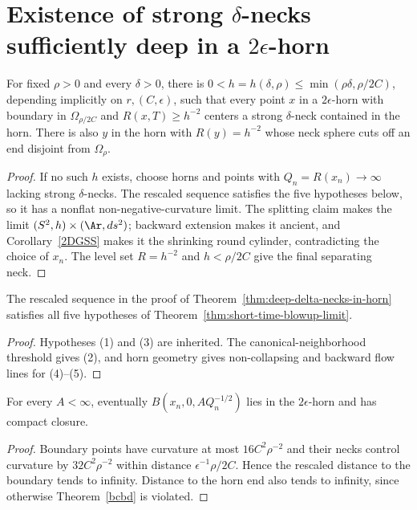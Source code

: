 \section{Existence of strong $\delta$-necks sufficiently deep in a $2\epsilon$-horn}
\begin{theorem}
\label{thm:deep-delta-necks-in-horn}\label{hexist}
For fixed $\rho>0$ and every $\delta>0$, there is
$0<h=h(\delta,\rho)\le\min(\rho\delta,\rho/2C)$, depending implicitly on
$r,(C,\epsilon)$, such that every point $x$ in a $2\epsilon$-horn with
boundary in $\Omega_{\rho/2C}$ and $R(x,T)\ge h^{-2}$ centers a strong
$\delta$-neck contained in the horn. There is also $y$ in the horn with
$R(y)=h^{-2}$ whose neck sphere cuts off an end disjoint from $\Omega_\rho$.
\end{theorem}
\begin{proof}
\sketch If no such $h$ exists, choose horns and points with
$Q_n=R(x_n)\to\infty$ lacking strong $\delta$-necks. The rescaled sequence
satisfies the five hypotheses below, so it has a nonflat non-negative-curvature
limit. The splitting claim makes the limit $(S^2,h)\times(\Ar,ds^2)$;
backward extension makes it ancient, and Corollary~\ref{2DGSS} makes it the
shrinking round cylinder, contradicting the choice of $x_n$. The level set
$R=h^{-2}$ and $h<\rho/2C$ give the final separating neck.\end{proof}

\begin{claim}
\label{claim:rescaled-sequence-satisfies-hypotheses}\label{hyp}
The rescaled sequence in the proof of Theorem~\ref{thm:deep-delta-necks-in-horn}
satisfies all five hypotheses of Theorem~\ref{thm:short-time-blowup-limit}.
\end{claim}
\begin{proof}\sketch Hypotheses (1) and
(3) are inherited. The canonical-neighborhood threshold gives (2), and horn
geometry gives non-collapsing and backward flow lines for (4)--(5).\end{proof}

\begin{claim}
\label{claim:ball-contained-in-horn-compact-closure}
For every $A<\infty$, eventually
$B(x_n,0,AQ_n^{-1/2})$ lies in the $2\epsilon$-horn and has compact closure.
\end{claim}
\begin{proof}\sketch Boundary points have curvature at most
$16C^2\rho^{-2}$ and their necks control curvature by $32C^2\rho^{-2}$ within
distance $\epsilon^{-1}\rho/2C$. Hence the rescaled distance to the boundary
tends to infinity. Distance to the horn end also tends to infinity, since
otherwise Theorem~\ref{bcbd} is violated.\end{proof}

